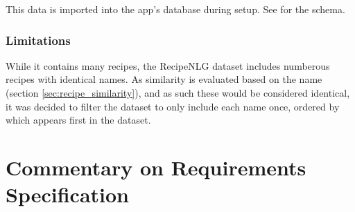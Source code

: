 This data is imported into the app's database during setup. See  for the schema.


\subsubsection{Limitations}
While it contains many recipes, the RecipeNLG dataset includes numberous recipes with identical names.
As similarity is evaluated based on the name (section \ref{sec:recipe_similarity}), and as such
these would be considered identical, it was decided to filter the dataset to only include each name once,
ordered by which appears first in the dataset.


\section{Commentary on Requirements Specification}

